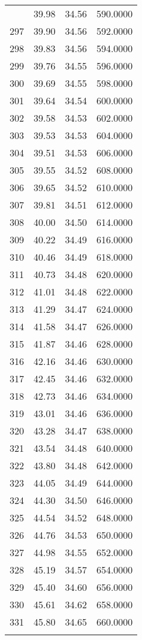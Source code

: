 \documentclass[
  captions=tableheading,
]{scrartcl}
\begin{document}
\begin{longtable} {l|l|l|l}
{296 &	39.98 &	34.56 &	590.0000\\
297 &	39.90 &	34.56 &	592.0000\\
298 &	39.83 &	34.56 &	594.0000\\
299 &	39.76 &	34.55 &	596.0000\\
300 &	39.69 &	34.55 &	598.0000\\
301 &	39.64 &	34.54 &	600.0000\\
302 &	39.58 &	34.53 &	602.0000\\
303 &	39.53 &	34.53 &	604.0000\\
304 &	39.51 &	34.53 &	606.0000\\
305 &	39.55 &	34.52 &	608.0000\\
306 &	39.65 &	34.52 &	610.0000\\
307 &	39.81 &	34.51 &	612.0000\\
308 &	40.00 &	34.50 &	614.0000\\
309 &	40.22 &	34.49 &	616.0000\\
310 &	40.46 &	34.49 &	618.0000\\
311 &	40.73 &	34.48 &	620.0000\\
312 &	41.01 &	34.48 &	622.0000\\
313 &	41.29 &	34.47 &	624.0000\\
314 &	41.58 &	34.47 &	626.0000\\
315 &	41.87 &	34.46 &	628.0000\\
316 &	42.16 &	34.46 &	630.0000\\
317 &	42.45 &	34.46 &	632.0000\\
318 &	42.73 &	34.46 &	634.0000\\
319 &	43.01 &	34.46 &	636.0000\\
320 &	43.28 &	34.47 &	638.0000\\
321 &	43.54 &	34.48 &	640.0000\\
322 &	43.80 &	34.48 &	642.0000\\
323 &	44.05 &	34.49 &	644.0000\\
324 &	44.30 &	34.50 &	646.0000\\
325 &	44.54 &	34.52 &	648.0000\\
326 &	44.76 &	34.53 &	650.0000\\
327 &	44.98 &	34.55 &	652.0000\\
328 &	45.19 &	34.57 &	654.0000\\
329 &	45.40 &	34.60 &	656.0000\\
330 &	45.61 &	34.62 &	658.0000\\
331 &	45.80 &	34.65 &	660.0000\\
}
\end{longtable}
\end{document}
